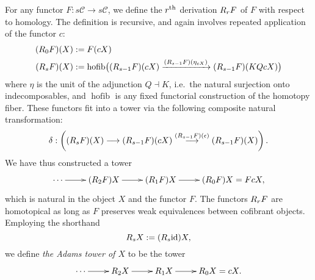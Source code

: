 \documentclass[11pt]{amsart} \renewcommand{\baselinestretch}{1.4}
\theoremstyle{plain}
\theoremstyle{definition}
\DeclareMathOperator*{\hofib}{hofib}
\renewcommand{\to}{\longrightarrow}
\newcommand{\calc}{\mathcal{C}}
\newcommand{\Id}{\mathrm{id}}
\newcommand{\algcat}{{\calc}}%
\newcommand{\dupdown}[2]{R_{\smash{#1}}}
\begin{document}
\begin{Bousfield-Kan spectral sequence}
For any functor $F:s\algcat\to s\algcat$, we define the $r^\textup{th}$ derivation $\dupdown{r}{c}F$ of $F$ with respect to  homology. The definition is recursive, and again involves repeated application of the functor $c$: 
\begin{alignat*}{2}
(\dupdown{0}{c}F)(X)
&:=
F(cX)%
\\
(\dupdown{s}{c}F)(X)
&:=
\hofib\bigl((\dupdown{s-1}{c}F)(cX)\xrightarrow{(\dupdown{s-1}{c}F)(\eta_{cX})} (\dupdown{s-1}{c}F)(KQcX)\bigr)
\end{alignat*}
where $\eta$ is the unit of the adjunction $Q\dashv K$, i.e.\ the natural surjection onto indecomposables, and $\hofib$ is any fixed  functorial construction of the homotopy fiber. These functors fit into a tower via the following composite natural transformation:
\[\delta:\left((\dupdown{s}{c}F)(X)\to (\dupdown{s-1}{c}F)(cX)\overset{(\dupdown{s-1}{c}F)(\epsilon)}{\to} (\dupdown{s-1}{c}F)(X)\right).\]
We have thus constructed a tower
\[\xymatrix@R=4mm{
\cdots 
\ar[r]
&%
(\dupdown{2}{c}F)X
\ar[r]
&%
(\dupdown{1}{c}F)X
\ar[r]&%
(\dupdown{0}{c}F)X=FcX,
}\]%
which is natural in the object $X$ and the functor $F$.
The functors $\dupdown{r}{c}F$ are homotopical as long as $F$ preserves weak equivalences between cofibrant objects. Employing the shorthand
\[\dupdown{s}{c}X:=(\dupdown{s}{c}\Id )X,\]
we define \emph{the Adams tower of $X$} to be the tower
\[\xymatrix@R=4mm{
\cdots 
\ar[r]
&%
\dupdown{2}{c}X
\ar[r]
&%
\dupdown{1}{c}X
\ar[r]&%
\dupdown{0}{c}X=cX.
}\]


\end{Bousfield-Kan spectral sequence}
\end{document}
